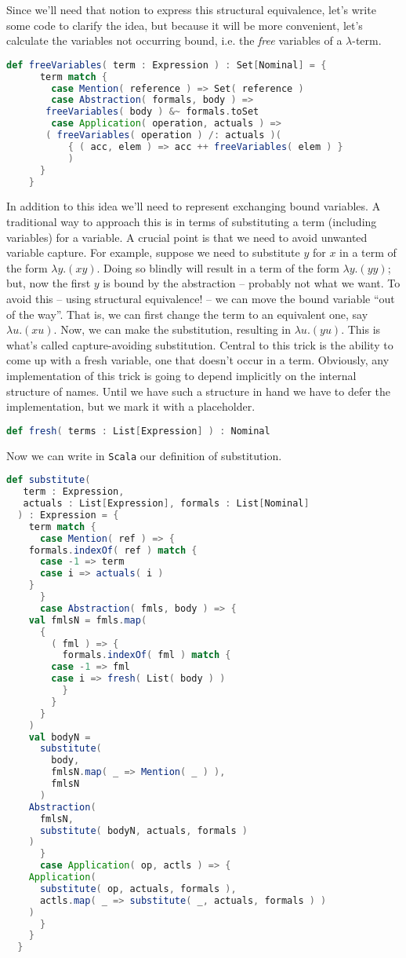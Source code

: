 Since we'll need that notion to express this structural equivalence,
let's write some code to clarify the idea, but because it will be more
convenient, let's calculate the variables not occurring bound,
i.e. the \emph{free} variables of a $\lambda$-term.

\begin{lstlisting}[language=Scala]
    def freeVariables( term : Expression ) : Set[Nominal] = {
      term match {
        case Mention( reference ) => Set( reference )
        case Abstraction( formals, body ) =>
	   freeVariables( body ) &~ formals.toSet
        case Application( operation, actuals ) =>
	   ( freeVariables( operation ) /: actuals )(
           { ( acc, elem ) => acc ++ freeVariables( elem ) } 
           )
      }
    }
\end{lstlisting}

In addition to this idea we'll need to represent exchanging bound
variables. A traditional way to approach this is in terms of
substituting a term (including variables) for a variable. A crucial
point is that we need to avoid unwanted variable capture. For example,
suppose we need to substitute $y$ for $x$ in a term of the form
$\lambda y.(x y)$. Doing so blindly will result in a term of the form
$\lambda y.(y y)$; but, now the first $y$ is bound by the abstraction
-- probably not what we want. To avoid this -- using structural
equivalence! -- we can move the bound variable ``out of the
way''. That is, we can first change the term to an equivalent one, say
$\lambda u.(x u)$. Now, we can make the substitution, resulting in
$\lambda u.(y u)$. This is what's called capture-avoiding
substitution. Central to this trick is the ability to come up with a
fresh variable, one that doesn't occur in a term. Obviously, any
implementation of this trick is going to depend implicitly on the
internal structure of names. Until we have such a structure in hand we
have to defer the implementation, but we mark it with a placeholder.

\begin{lstlisting}[language=Scala]
  def fresh( terms : List[Expression] ) : Nominal
\end{lstlisting}

Now we can write in \texttt{Scala} our definition of substitution.

\break
\begin{lstlisting}[language=Scala]
   def substitute(
   term : Expression,
   actuals : List[Expression], formals : List[Nominal]
  ) : Expression = {
    term match {
      case Mention( ref ) => {
	formals.indexOf( ref ) match {
	  case -1 => term
	  case i => actuals( i )
	}
      }
      case Abstraction( fmls, body ) => {
	val fmlsN = fmls.map(
	  {
	    ( fml ) => {
	      formals.indexOf( fml ) match {
		case -1 => fml
		case i => fresh( List( body ) )
	      }
	    }
	  }	      
	)
	val bodyN =
	  substitute(
	    body,
	    fmlsN.map( _ => Mention( _ ) ),
	    fmlsN
	  )
	Abstraction(
	  fmlsN,
	  substitute( bodyN, actuals, formals )
	)
      }
      case Application( op, actls ) => {
	Application(
	  substitute( op, actuals, formals ),
	  actls.map( _ => substitute( _, actuals, formals ) )
	)
      }
    }
  }
\end{lstlisting}


